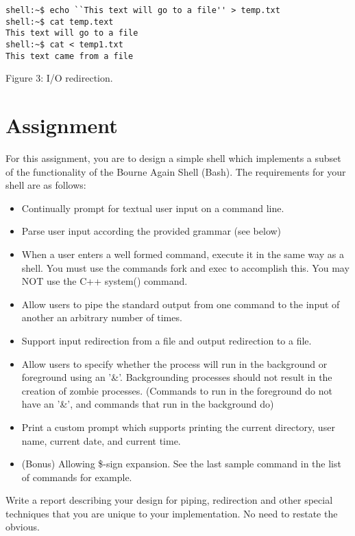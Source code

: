 \documentclass[12pt]{article}
\begin{document}
\begin{center}
\begin{lstlisting}[style=bash]
shell:~$ echo ``This text will go to a file'' > temp.txt
shell:~$ cat temp.text
This text will go to a file
shell:~$ cat < temp1.txt
This text came from a file
\end{lstlisting}
Figure 3: I/O redirection.
\end{center}

\section*{Assignment}
For this assignment, you are to design a simple shell which implements a subset of the functionality of the Bourne Again Shell (Bash).  The requirements for your shell are as follows:

\begin{itemize}
    \setlength\itemsep{-0.1em}

    \item Continually prompt for textual user input on a command line.
    \item Parse user input according the provided grammar (see below)
    \item When a user enters a well formed command, execute it in the same way as a shell.  You must use the commands fork and exec to accomplish this.  You may NOT use the C++ system() command.
    \item Allow users to pipe the standard output from one command to the input of another an arbitrary number of times.
    \item Support input redirection from a file and output redirection to a file.
    \item Allow users to specify whether the process will run in the background or foreground using an '\&'.  Backgrounding processes should not result in the creation of zombie processes.  (Commands to run in the foreground do not have an '\&', and commands that run in the background do)
    \item Print a custom prompt which supports printing the current directory, user name, current date, and current time.
	\item (Bonus) Allowing \$-sign expansion. See the last sample command in the list of commands for example.
\end{itemize}

Write a report describing your design for piping, redirection and other special techniques that you are unique to your implementation. No need to restate the obvious.
\end{document}
